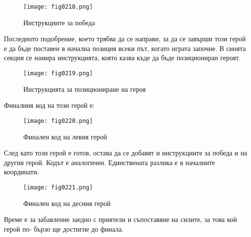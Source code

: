 \begin{figure}[H]
  \centering
  \texttt{[image: fig0218.png]}
  \caption{Инструкциите за победа}
\label{fig0218}
\end{figure}

Последното подобрение, което трябва да се направи, за да се завърши този герой е да бъде поставен в начална позиция всеки път, когато играта започне. В синята секция се намира инструкцията, която казва къде да бъде позициониран героят.

\begin{figure}[H]
  \centering
  \texttt{[image: fig0219.png]}
  \caption{Инструкцията за позициониране на героя}
\label{fig0219}
\end{figure}

Финалния код на този герой е:

\begin{figure}[H]
  \centering
  \texttt{[image: fig0220.png]}
  \caption{Финален код на левия герой}
\label{fig0220}
\end{figure}

След като този герой е готов, остава да се добавят и инструкциите за победа и на другия герой. Кодът е аналогичен. Единствената разлика е в началните координати.

\begin{figure}[H]
  \centering
  \texttt{[image: fig0221.png]}
  \caption{Финален код на десния герой}
\label{fig0221}
\end{figure}

Време е за забавление заедно с приятели и съпоставяне на силите, за това кой герой по- бързо ще достигне до финала.